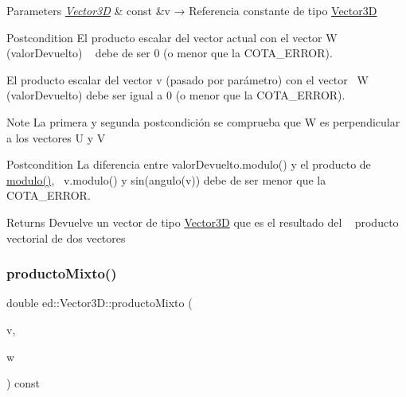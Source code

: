 \begin{DoxyParams}{Parameters}
{\em \mbox{\hyperlink{classed_1_1Vector3D}{Vector3D}}} & const \&v → Referencia constante de tipo \mbox{\hyperlink{classed_1_1Vector3D}{Vector3D}} \\
\hline
\end{DoxyParams}
\begin{DoxyPostcond}{Postcondition}
El producto escalar del vector actual con el vector W (valor\+Devuelto) ~\newline
 debe de ser 0 (o menor que la C\+O\+T\+A\+\_\+\+E\+R\+R\+OR). 

El producto escalar del vector v (pasado por parámetro) con el vector~\newline
 W (valor\+Devuelto) debe ser igual a 0 (o menor que la C\+O\+T\+A\+\_\+\+E\+R\+R\+OR). 
\end{DoxyPostcond}
\begin{DoxyNote}{Note}
La primera y segunda postcondición se comprueba que W es perpendicular~\newline
 a los vectores U y V 
\end{DoxyNote}
\begin{DoxyPostcond}{Postcondition}
La diferencia entre valor\+Devuelto.\+modulo() y el producto de \mbox{\hyperlink{classed_1_1Vector3D_a9db1b9e9d7634efeb88f60130283bc9a}{modulo()}},~\newline
 v.\+modulo() y sin(angulo(v)) debe de ser menor que la C\+O\+T\+A\+\_\+\+E\+R\+R\+OR. 
\end{DoxyPostcond}
\begin{DoxyReturn}{Returns}
Devuelve un vector de tipo \mbox{\hyperlink{classed_1_1Vector3D}{Vector3D}} que es el resultado del ~\newline
 producto vectorial de dos vectores 
\end{DoxyReturn}
\mbox{\label{classed_1_1Vector3D_a2063f0cdfdb6a34e4f426a1f247a4459}} 
\subsubsection{\texorpdfstring{producto\+Mixto()}{productoMixto()}}
{\footnotesize\ttfamily double ed\+::\+Vector3\+D\+::producto\+Mixto (\begin{DoxyParamCaption}\item[{\mbox{\hyperlink{classed_1_1Vector3D}{Vector3D}} const \&}]{v,  }\item[{\mbox{\hyperlink{classed_1_1Vector3D}{Vector3D}} const \&}]{w }\end{DoxyParamCaption}) const}




